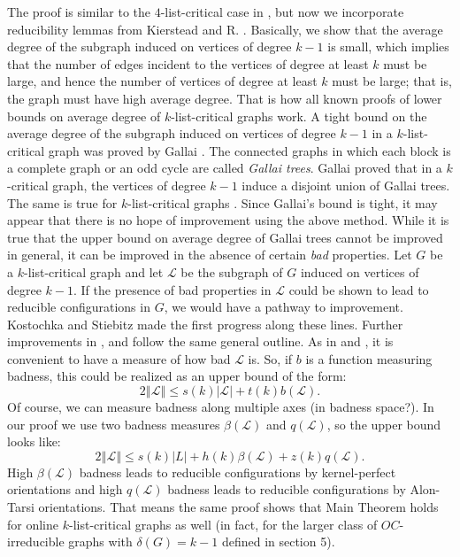 \documentclass[10pt]{article}
\theoremstyle{plain}
\theoremstyle{definition}
\theoremstyle{remark}
\newcommand{\fancy}[1]{\mathcal{#1}}
\renewcommand{\L}{\fancy{L}}
\newcommand{\card}[1]{\left|#1\right|}
\newcommand{\size}[1]{\left\Vert#1\right\Vert}
\begin{document}
The proof is similar to the $4$-list-critical case in \cite{Better4ListCriticalBound}, but now we incorporate reducibility lemmas from Kierstead and R. \cite{OreVizing}.  
Basically, we show that the average degree of the subgraph induced on vertices of degree $k-1$ is small, which implies that the number of edges incident to the vertices of degree at least $k$ must be large,
and hence the number of vertices of degree at least $k$ must be large; that is, the graph must have high average degree.  That is how all known proofs of lower bounds on average degree of $k$-list-critical graphs work.
A tight bound on the average degree of the subgraph induced on vertices of degree $k-1$ in a $k$-list-critical graph was proved by Gallai \cite{gallai1963kritische}.  The connected graphs in which each block is a complete graph
or an odd cycle are called \emph{Gallai trees}.  Gallai \cite{gallai1963kritische} proved that in a $k$-critical graph, the vertices of degree $k-1$ induce a disjoint union of Gallai trees.  
The same is true for $k$-list-critical graphs \cite{borodin1977criterion, erdos1979choosability}.  Since Gallai's bound is tight, it may appear that there is no hope of improvement using the above method.  
While it is true that the upper bound on average degree of Gallai trees cannot be improved in general, it can be improved in the absence of certain \emph{bad} properties.  
Let $G$ be a $k$-list-critical graph and let $\L$ be the subgraph of $G$ induced on vertices of degree $k-1$.
If the presence of bad properties in $\L$ could be shown to lead to reducible configurations in $G$, we would have a pathway to improvement.  Kostochka and Stiebitz \cite{kostochkastiebitzedgesincriticalgraph}
made the first progress along these lines.  Further improvements in \cite{OreVizing}, \cite{DischargingLowerBound} and \cite{Better4ListCriticalBound} follow the same general outline.  
As in \cite{DischargingLowerBound} and \cite{Better4ListCriticalBound}, it is convenient to have a measure of how bad $\L$ is.  So, if $b$ is a function measuring badness, this could be realized as
an upper bound of the form:
\[2\size{\L} \le s(k)\card{\L} + t(k)b(\L).\]
Of course, we can measure badness along multiple axes (in badness space?).  In our proof we use two badness measures $\beta(\L)$ and $q(\L)$, so the upper bound looks like:
\[2\size{\L} \le s(k)\card{L} + h(k)\beta(\L) + z(k)q(\L).\]
High $\beta(\L)$ badness leads to reducible configurations by kernel-perfect orientations and high $q(\L)$ badness leads to reducible configurations by Alon-Tarsi orientations.
That means the same proof shows that Main Theorem holds for online $k$-list-critical graphs as well (in fact, for the larger class of $OC$-irreducible graphs with $\delta(G) = k-1$ defined in section 5).
\end{document}
